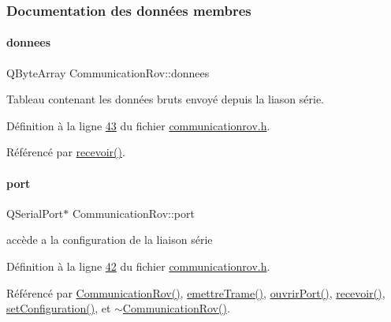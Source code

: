 \subsubsection{Documentation des données membres}
\mbox{\label{class_communication_rov_acbb6939bb597179956c6f4bc5ca39f3f}} 
\paragraph{\texorpdfstring{donnees}{donnees}}
{\footnotesize\ttfamily Q\+Byte\+Array Communication\+Rov\+::donnees\hspace{0.3cm}{\ttfamily [private]}}



Tableau contenant les données bruts envoyé depuis la liason série. 



Définition à la ligne \hyperlink{communicationrov_8h_source_l00043}{43} du fichier \hyperlink{communicationrov_8h_source}{communicationrov.\+h}.



Référencé par \hyperlink{communicationrov_8cpp_source_l00073}{recevoir()}.

\mbox{\label{class_communication_rov_a21b62067ef0b2a6aec339df60b4abd72}} 
\paragraph{\texorpdfstring{port}{port}}
{\footnotesize\ttfamily Q\+Serial\+Port$\ast$ Communication\+Rov\+::port\hspace{0.3cm}{\ttfamily [private]}}



accède a la configuration de la liaison série 



Définition à la ligne \hyperlink{communicationrov_8h_source_l00042}{42} du fichier \hyperlink{communicationrov_8h_source}{communicationrov.\+h}.



Référencé par \hyperlink{communicationrov_8cpp_source_l00009}{Communication\+Rov()}, \hyperlink{communicationrov_8cpp_source_l00060}{emettre\+Trame()}, \hyperlink{communicationrov_8cpp_source_l00037}{ouvrir\+Port()}, \hyperlink{communicationrov_8cpp_source_l00073}{recevoir()}, \hyperlink{communicationrov_8cpp_source_l00050}{set\+Configuration()}, et \hyperlink{communicationrov_8cpp_source_l00030}{$\sim$\+Communication\+Rov()}.


